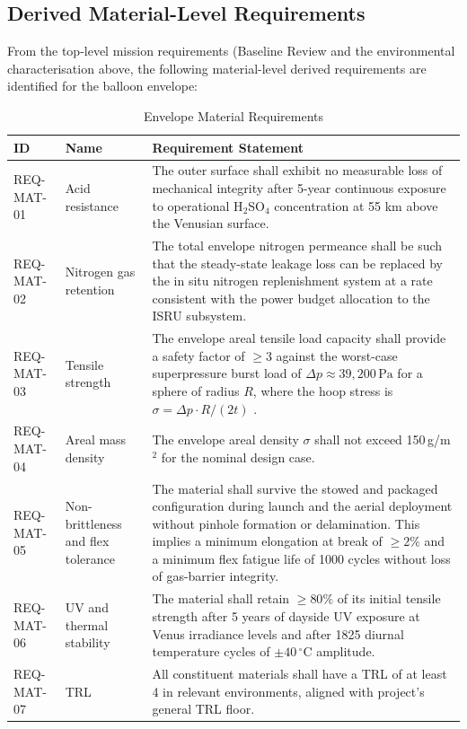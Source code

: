 \subsection{Derived Material-Level Requirements}
\label{sec:mat-requirements}

From the top-level mission requirements (Baseline Review \cite{baseline_vista} and the environmental characterisation above, the following material-level derived requirements are identified for the balloon envelope:

\begin{table}[H]
\centering
\small
\caption{Envelope Material Requirements}
\begin{tabular}{|l|p{3.5cm}|p{9cm}|}
\hline
\textbf{ID} & \textbf{Name} & \textbf{Requirement Statement} \\ \hline

REQ-MAT-01 & Acid resistance & The outer surface shall exhibit no measurable loss of mechanical integrity after 5-year continuous exposure to operational H$_2$SO$_4$ concentration at 55 km above the Venusian surface. \\ \hline

REQ-MAT-02 & Nitrogen gas retention & The total envelope nitrogen permeance shall be such that the steady-state leakage loss can be replaced by the in situ nitrogen replenishment system at a rate consistent with the power budget allocation to the ISRU subsystem. \\ \hline

REQ-MAT-03 & Tensile strength & The envelope areal tensile load capacity shall provide a safety factor of $\geq 3$ against the worst-case superpressure burst load of $\Delta p \approx 39{,}200\,\mathrm{Pa}$ for a sphere of radius $R$, where the hoop stress is $\sigma = \Delta p \cdot R / (2t)$ \cite{Hall2007_VenusPrototype}. \\ \hline

REQ-MAT-04 & Areal mass density & The envelope areal density $\sigma$ shall not exceed 150\,g/m$^2$ for the nominal design case. \\ \hline

REQ-MAT-05 & Non-brittleness and flex tolerance & The material shall survive the stowed and packaged configuration during launch and the aerial deployment without pinhole formation or delamination. This implies a minimum elongation at break of $\geq 2\%$ and a minimum flex fatigue life of 1000 cycles without loss of gas-barrier integrity. \\ \hline

REQ-MAT-06 & UV and thermal stability & The material shall retain $\geq 80\%$ of its initial tensile strength after 5 years of dayside UV exposure at Venus irradiance levels and after 1825 diurnal temperature cycles of $\pm 40\,^\circ$C amplitude. \\ \hline

REQ-MAT-07 & TRL & All constituent materials shall have a TRL of at least 4 in relevant environments, aligned with project's general TRL floor. \\ \hline

\end{tabular}
\label{tab:material_requirements}
\end{table}


